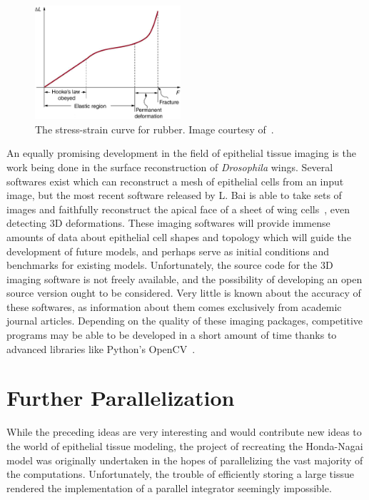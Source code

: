 \begin{figure}
  \begin{center}
    \includegraphics[width=0.48\textwidth]{../diagrams/rubber.jpeg}
  \end{center}
  \caption{The stress-strain curve for rubber. Image courtesy of~\cite{rubr}.}
\label{fig:rubber}
\end{figure}

An equally promising development in the field of epithelial tissue imaging is the work being done in the surface reconstruction of \emph{Drosophila} wings. Several softwares exist which can reconstruct a mesh of epithelial cells from an input image, but the most recent software released by L. Bai is able to take sets of images and faithfully reconstruct the apical face of a sheet of wing cells~\cite{CellSurf}, even detecting 3D deformations. These imaging softwares will provide immense amounts of data about epithelial cell shapes and topology which will guide the development of future models, and perhaps serve as initial conditions and benchmarks for existing models. Unfortunately, the source code for the 3D imaging software is not freely available, and the possibility of developing an open source version ought to be considered. Very little is known about the accuracy of these softwares, as information about them comes exclusively from academic journal articles. Depending on the quality of these imaging packages, competitive programs may be able to be developed in a short amount of time thanks to advanced libraries like Python's OpenCV~\cite{OpenCV}.

\section{Further Parallelization}
While the preceding ideas are very interesting and would contribute new ideas to the world of epithelial tissue modeling, the project of recreating the Honda-Nagai model was originally undertaken in the hopes of parallelizing the vast majority of the computations. Unfortunately, the trouble of efficiently storing a large tissue rendered the implementation of a parallel integrator seemingly impossible. 

